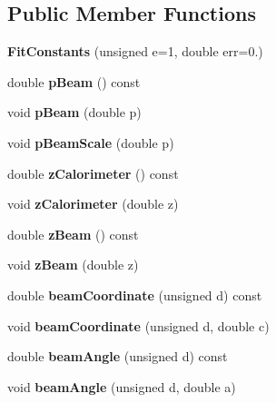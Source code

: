 \subsection*{Public Member Functions}
\begin{DoxyCompactItemize}
\item 
{\bfseries Fit\-Constants} (unsigned e=1, double err=0.)\label{classTBTrack_1_1FitConstants_a47ddb6700da0d5c104eb0c369d80911e}

\item 
double {\bfseries p\-Beam} () const \label{classTBTrack_1_1FitConstants_a133ea6b18d89af235a741119259e0dbb}

\item 
void {\bfseries p\-Beam} (double p)\label{classTBTrack_1_1FitConstants_a9ce9a2d41aa782c4298a72d5c0eb209c}

\item 
void {\bfseries p\-Beam\-Scale} (double p)\label{classTBTrack_1_1FitConstants_a6af5bc62244d18b251e7954368ecb9c9}

\item 
double {\bfseries z\-Calorimeter} () const \label{classTBTrack_1_1FitConstants_acdbec3521ff0b24abf68178cc2f2618b}

\item 
void {\bfseries z\-Calorimeter} (double z)\label{classTBTrack_1_1FitConstants_af8a150ebd1d2265be0a0640aa58fac87}

\item 
double {\bfseries z\-Beam} () const \label{classTBTrack_1_1FitConstants_a4375d97e5d050aebd2b9462bbf215c75}

\item 
void {\bfseries z\-Beam} (double z)\label{classTBTrack_1_1FitConstants_afe66619121004ae499b40341e0d78eaf}

\item 
double {\bfseries beam\-Coordinate} (unsigned d) const \label{classTBTrack_1_1FitConstants_ad67c0f98da288bdaa426ee94a25056e1}

\item 
void {\bfseries beam\-Coordinate} (unsigned d, double c)\label{classTBTrack_1_1FitConstants_a999f0fc68f7ddbf17fa49fc77b2ca542}

\item 
double {\bfseries beam\-Angle} (unsigned d) const \label{classTBTrack_1_1FitConstants_ada6619cbead5a277f3a99df287094fb5}

\item 
void {\bfseries beam\-Angle} (unsigned d, double a)\label{classTBTrack_1_1FitConstants_a52e266c03c76f8bc27b2eae2f731618d}


\end{DoxyCompactItemize}
